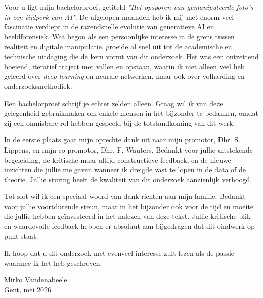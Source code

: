 
\chapter*{}%
\label{ch:voorwoord}

Voor u ligt mijn bachelorproef, getiteld \emph{"Het opsporen van gemanipuleerde foto's in een tijdperk van AI"}. De afgelopen maanden heb ik mij met enorm veel fascinatie verdiept in de razendsnelle evolutie van generatieve AI en beeldforensiek. Wat begon als een persoonlijke interesse in de grens tussen realiteit en digitale manipulatie, groeide al snel uit tot de academische en technische uitdaging die de kern vormt van dit onderzoek. Het was een ontzettend boeiend, iteratief traject met vallen en opstaan, waarin ik niet alleen veel heb geleerd over \emph{deep learning} en neurale netwerken, maar ook over volharding en onderzoeksmethodiek.

Een bachelorproef schrijf je echter zelden alleen. Graag wil ik van deze gelegenheid gebruikmaken om enkele mensen in het bijzonder te bedanken, omdat zij een onmisbare rol hebben gespeeld bij de totstandkoming van dit werk. 

In de eerste plaats gaat mijn oprechte dank uit naar mijn promotor, Dhr. S. Lippens, en mijn co-promotor, Dhr. F. Wauters. Bedankt voor jullie uitstekende begeleiding, de kritische maar altijd constructieve feedback, en de nieuwe inzichten die jullie me gaven wanneer ik dreigde vast te lopen in de data of de theorie. Jullie sturing heeft de kwaliteit van dit onderzoek aanzienlijk verhoogd.

Tot slot wil ik een speciaal woord van dank richten aan mijn familie. Bedankt voor jullie voortdurende steun, maar in het bijzonder ook voor de tijd en moeite die jullie hebben geïnvesteerd in het nalezen van deze tekst. Jullie kritische blik en waardevolle feedback hebben er absoluut aan bijgedragen dat dit eindwerk op punt staat.

Ik hoop dat u dit onderzoek met evenveel interesse zult lezen als de passie waarmee ik het heb geschreven.

\vspace{1cm}
\noindent Mirko Vandenabeele \\
Gent, mei 2026
